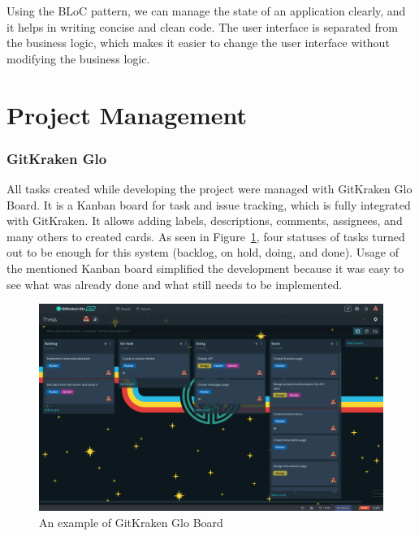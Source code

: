 Using the BLoC pattern, we can manage the state of an application clearly, and it helps in writing concise and clean code. The user interface is separated from the business logic, which makes it easier to change the user interface without modifying the business logic.~\cite{bloc-pattern}


\section{Project Management}
\subsubsection{GitKraken Glo}
All tasks created while developing the project were managed with GitKraken Glo Board. It is a Kanban board for task and issue tracking, which is fully integrated with GitKraken. It allows adding labels, descriptions, comments, assignees, and many others to created cards. As seen in Figure~\ref{fig:glo-board}, four statuses of tasks turned out to be enough for this system (backlog, on hold, doing, and done). Usage of the mentioned Kanban board simplified the development because it was easy to see what was already done and what still needs to be implemented.

\begin{figure}[htb]
    \centering
    \includegraphics[width=\textwidth]{fig04/glo_board.png}
    \caption{An example of GitKraken Glo Board} \label{fig:glo-board}
\end{figure}

